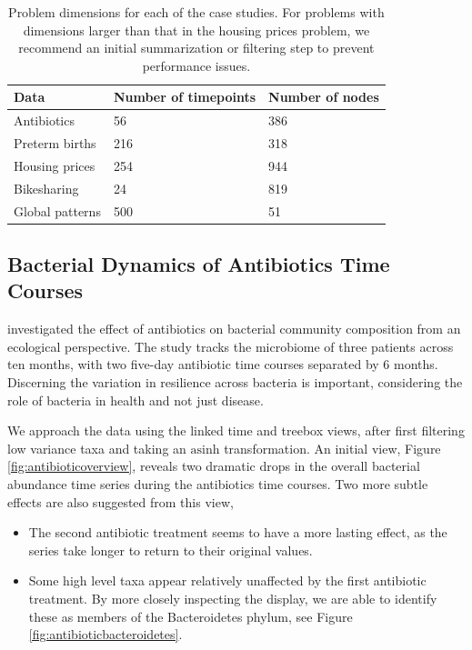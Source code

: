 \documentclass[12pt]{article}
\begin{document}
\begin{table}
\centering
\begin{tabular}{|l|l|l|}
  \hline
  Data            & Number of timepoints & Number of nodes \\
  \hline
  Antibiotics     & 56                 & 386             \\
  Preterm births  & 216                & 318             \\
  Housing prices  & 254                & 944             \\
  Bikesharing     & 24                 & 819             \\
  Global patterns & 500                & 51             \\
  \hline
\end{tabular}
\caption{Problem dimensions for each of the case studies. For problems with
  dimensions larger than that in the housing prices problem, we recommend an
  initial summarization or filtering step to prevent performance
  issues. \label{problem-scaling}}
\end{table}

\subsection{Bacterial Dynamics of Antibiotics Time
Courses}\label{bacterial-dynamics-of-antibiotics-time-courses}

\citet{dethlefsen2008pervasive} investigated the effect of antibiotics on
bacterial community composition from an ecological perspective. The study tracks
the microbiome of three patients across ten months, with two five-day antibiotic
time courses separated by 6 months. Discerning the variation in resilience
across bacteria is important, considering the role of bacteria in health and
not just disease.

We approach the data using the linked time and treebox views, after first
filtering low variance taxa and taking an \(\text{asinh}\) transformation. An
initial view, Figure \ref{fig:antibioticoverview}, reveals two dramatic drops in
the overall bacterial abundance time series during the antibiotics time courses.
Two more subtle effects are also suggested from this view,

\begin{itemize}
\item
  The second antibiotic treatment seems to have a more lasting effect,
  as the series take longer to return to their original values.
\item
  Some high level taxa appear relatively unaffected by the first
  antibiotic treatment. By more closely inspecting the display, we are
  able to identify these as members of the Bacteroidetes phylum, see
  Figure \ref{fig:antibioticbacteroidetes}.
\end{itemize}
\end{document}
